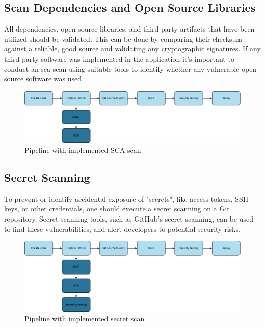 \subsection{Scan Dependencies and Open Source Libraries}
All dependencies, open-source libraries, and third-party \gls{artifact}s that have been utilized should be validated. This can be done by comparing their checksum against a reliable, good source and validating any cryptographic signatures. If any third-party software was implemented in the application it's important to conduct an \acrshort{sca} scan using suitable tools to identify whether any vulnerable open-source software was used. \cite{bestpracticeSupplyChain}

\vspace{2mm}
\begin{figure}[H]
    \centering
    \includegraphics[width=0.8\columnwidth]{Images/pipeline3.png}
    \caption{Pipeline with implemented SCA scan}
    \label{fig: Pipeline with implemented SCA scan}
\end{figure}

\subsection{Secret Scanning}
To prevent or identify accidental exposure of "secrets", like access tokens, SSH keys, or other credentials, one should execute a secret scanning on a Git repository. Secret scanning tools, such as GitHub's secret scanning, can be used to find these vulnerabilities, and alert developers to potential security risks. \cite{GithubSecretScanning}

\vspace{2mm}
\begin{figure}[H]
    \centering
    \includegraphics[width=0.8\columnwidth]{Images/pipeline4.png}
    \caption{Pipeline with implemented secret scan}
    \label{fig: Pipeline with implemented secret scan}
\end{figure}

